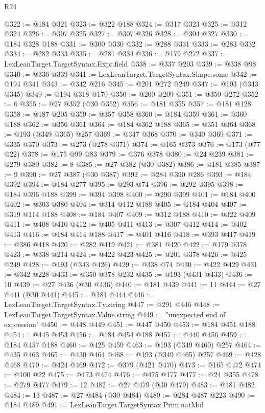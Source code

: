 \begin{lexlean}{R24}
\begin{coremodule}
@322 := @184 @321
@323 := @322 @188
@324 := @317 @323
@325 := @312 @324
@326 := @307 @325
@327 := @307 @326
@328 := @304 @327
@330 := @184 @328 @188
@331 := @300 @330
@332 := @288 @331
@333 := @283 @332
@334 := @282 @333
@335 := @281 @334
@336 := @179 @272
@337 := LexLeanTarget.TargetSyntax.Expr.field
@338 := @337 @203
@339 := @338 @98
@340 := @336 @339
@341 := LexLeanTarget.TargetSyntax.Shape.some
@342 := @194 @341
@343 := @342 @216
@345 := @201 @272 @249
@347 := @193 (@343 @345)
@349 := @194 @318 @170
@350 := @200 @209
@351 := @350 @272
@352 := 6
@355 := @27 @352 (@30 @352)
@356 := @181 @355
@357 := @181 @128
@358 := @187 @205
@359 := @357 @358
@360 := @184 @359
@361 := @360 @188
@362 := @356 @361
@364 := @184 @362 @188
@365 := @351 @364
@368 := @193 (@349 @365) @257
@369 := @347 @368
@370 := @340 @369
@371 := @335 @370
@373 := @273 (@278 @371)
@374 := @165 @373
@376 := @173 (@77 @22)
@378 := @175 @99 @83
@379 := @376 @378
@380 := @24 @239
@381 := @279 @380
@382 := 8
@385 := @27 @382 (@30 @382)
@386 := @181 @385
@387 := 9
@390 := @27 @387 (@30 @387)
@392 := @284 @390 @286
@393 := @184 @392
@394 := @184 @277
@395 := @293 @74
@396 := @292 @395
@398 := @184 @396 @188
@399 := @394 @398
@400 := @290 @399
@401 := @184 @400
@402 := @303 @380
@404 := @314 @112 @188
@405 := @184 @404
@407 := @319 @114 @188
@408 := @184 @407
@409 := @312 @188
@410 := @322 @409
@411 := @408 @410
@412 := @405 @411
@413 := @307 @412
@414 := @402 @413
@416 := @184 @414 @188
@417 := @401 @416
@418 := @393 @417
@419 := @386 @418
@420 := @282 @419
@421 := @381 @420
@422 := @179 @378
@423 := @338 @214
@424 := @422 @423
@425 := @201 @378
@426 := @425 @249
@428 := @193 (@343 @426)
@429 := @338 @74
@430 := @422 @429
@431 := @342 @228
@433 := @350 @378 @232
@435 := @193 (@431 @433)
@436 := 10
@439 := @27 @436 (@30 @436)
@440 := @181 @439
@441 := 11
@444 := @27 @441 (@30 @441)
@445 := @181 @444
@446 := LexLeanTarget.TargetSyntax.Ty.string
@447 := @291 @446
@448 := LexLeanTarget.TargetSyntax.Value.string
@449 := "unexpected end of expression"
@450 := @448 @449
@451 := @447 @450
@453 := @184 @451 @188
@454 := @445 @453
@456 := @184 @454 @188
@457 := @440 @456
@459 := @184 @457 @188
@460 := @425 @459
@463 := @193 (@349 @460) @257
@464 := @435 @463
@465 := @430 @464
@468 := @193 (@349 @465) @257
@469 := @428 @468
@470 := @424 @469
@472 := @379 (@421 @470)
@473 := @165 @472
@474 := @100 @22
@475 := @173 @474
@476 := @475 @177
@477 := @24 @355
@478 := @279 @477
@479 := 12
@482 := @27 @479 (@30 @479)
@483 := @181 @482
@484 := 13
@487 := @27 @484 (@30 @484)
@489 := @284 @487 @223
@490 := @184 @489
@491 := LexLeanTarget.TargetSyntax.Prim.natMul

\end{coremodule}
\end{lexlean}
